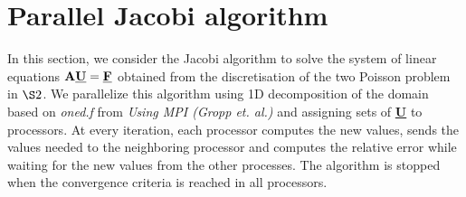 \section{Parallel Jacobi algorithm }
In this section, we consider the Jacobi algorithm to solve the system of linear equations $\textbf{A}\textbf{\underline{U}} = \textbf{\underline{F}}$ obtained from the discretisation of the two Poisson problem in $\S 2$. We parallelize this algorithm using 1D decomposition of the domain based on \emph{oned.f} from \emph{Using MPI (Gropp et. al.)} and assigning sets of \textbf{\underline{U}} to processors. At every iteration, each processor computes the new values, sends the values needed to the neighboring processor and computes the relative error while waiting for the new values from the other processes. The algorithm is stopped when the convergence criteria is reached in all processors.

